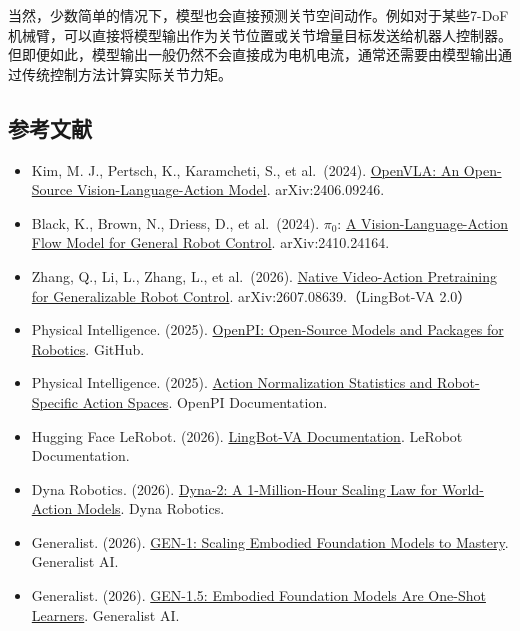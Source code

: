 当然，少数简单的情况下，模型也会直接预测关节空间动作。例如对于某些7-DoF机械臂，可以直接将模型输出作为关节位置或关节增量目标发送给机器人控制器。但即便如此，模型输出一般仍然不会直接成为电机电流，通常还需要由模型输出通过传统控制方法计算实际关节力矩。

\FloatBarrier
{}
\hypertarget{ux53c2ux8003ux6587ux732e-150}{%
\subsection{参考文献}\label{ux53c2ux8003ux6587ux732e-150}}

\vspace{0.25em}
\begin{itemize}
\tightlist
\item
  Kim, M. J., Pertsch, K., Karamcheti, S., et al.~(2024). \href{https://arxiv.org/abs/2406.09246}{OpenVLA: An Open-Source Vision-Language-Action Model}. arXiv:2406.09246.
\item
  Black, K., Brown, N., Driess, D., et al.~(2024). \(\pi_0\): \href{https://arxiv.org/abs/2410.24164}{A Vision-Language-Action Flow Model for General Robot Control}. arXiv:2410.24164.
\item
  Zhang, Q., Li, L., Zhang, L., et al.~(2026). \href{https://arxiv.org/abs/2607.08639}{Native Video-Action Pretraining for Generalizable Robot Control}. arXiv:2607.08639.（LingBot-VA 2.0）
\item
  Physical Intelligence. (2025). \href{https://github.com/Physical-Intelligence/openpi}{OpenPI: Open-Source Models and Packages for Robotics}. GitHub.
\item
  Physical Intelligence. (2025). \href{https://github.com/Physical-Intelligence/openpi/blob/main/docs/norm_stats.md}{Action Normalization Statistics and Robot-Specific Action Spaces}. OpenPI Documentation.
\item
  Hugging Face LeRobot. (2026). \href{https://huggingface.co/docs/lerobot/main/lingbot_va}{LingBot-VA Documentation}. LeRobot Documentation.
\item
  Dyna Robotics. (2026). \href{https://www.dyna.co/dyna-2}{Dyna-2: A 1-Million-Hour Scaling Law for World-Action Models}. Dyna Robotics.
\item
  Generalist. (2026). \href{https://generalistai.com/blog/gen-1}{GEN-1: Scaling Embodied Foundation Models to Mastery}. Generalist AI.
\item
  Generalist. (2026). \href{https://generalistai.com/blog/gen-1.5}{GEN-1.5: Embodied Foundation Models Are One-Shot Learners}. Generalist AI.

\end{itemize}
